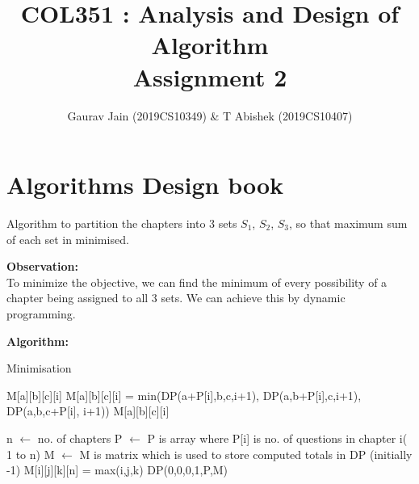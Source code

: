 \documentclass[a4paper]{article}
\begin{document}

\title{\textbf{COL351 : Analysis and Design of Algorithm \\ Assignment 2 }}
\author{Gaurav Jain (2019CS10349) \& T Abishek (2019CS10407)}
\date{}

\maketitle

\section{Algorithms Design book}

Algorithm to partition the chapters into 3 sets $S_1$, $S_2$, $S_3$, so that maximum sum of each set in minimised.

\textbf{Observation:}\\
To minimize the objective, we can find the minimum of every possibility of a chapter being assigned to all 3 sets. We can achieve this by dynamic programming.

\textbf{Algorithm:}
    
    {\centering
    \begin{minipage}{\linewidth}
    \begin{algorithm}[H]
    \caption{Minimisation}\label{alg:ts}
    \begin{algorithmic}[1]
        \State \Return M[a][b][c][i]
    \EndIf
    \State M[a][b][c][i] = min(DP(a+P[i],b,c,i+1), DP(a,b+P[i],c,i+1), DP(a,b,c+P[i], i+1))
    \State \Return M[a][b][c][i]
    \EndProcedure
    
    \State n $\gets$ no. of chapters
    \State P $\gets$ P is array where P[i] is no. of questions in chapter i( 1 to n)
    \State M $\gets$ M is matrix which is used to store computed totals in DP (initially -1)
                \State M[i][j][k][n] = max(i,j,k)
    \EndFor
    \EndFor
    \EndFor
    \State \Return DP(0,0,0,1,P,M)
    \end{algorithmic}
    \end{algorithm}
    \end{minipage}
    \par}
    
\end{document}
